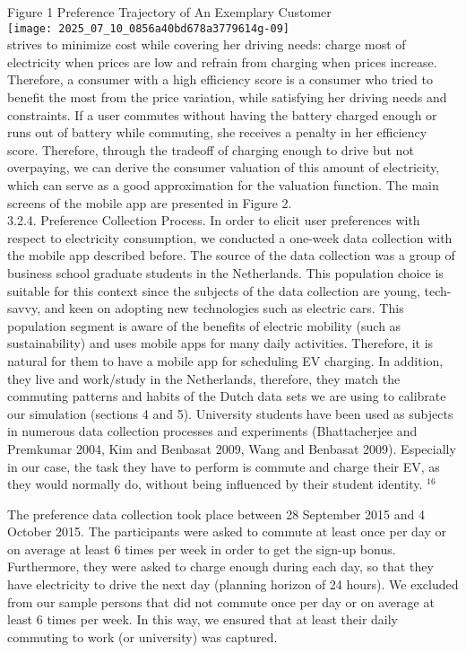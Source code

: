 \documentclass[10pt]{article}
\begin{document}
Figure 1 Preference Trajectory of An Exemplary Customer\\
\texttt{[image: 2025\_07\_10\_0856a40bd678a3779614g-09]}\\
strives to minimize cost while covering her driving needs: charge most of electricity when prices are low and refrain from charging when prices increase. Therefore, a consumer with a high efficiency score is a consumer who tried to benefit the most from the price variation, while satisfying her driving needs and constraints. If a user commutes without having the battery charged enough or runs out of battery while commuting, she receives a penalty in her efficiency score. Therefore, through the tradeoff of charging enough to drive but not overpaying, we can derive the consumer valuation of this amount of electricity, which can serve as a good approximation for the valuation function. The main screens of the mobile app are presented in Figure 2.\\
3.2.4. Preference Collection Process. In order to elicit user preferences with respect to electricity consumption, we conducted a one-week data collection with the mobile app described before. The source of the data collection was a group of business school graduate students in the Netherlands. This population choice is suitable for this context since the subjects of the data collection are young, tech-savvy, and keen on adopting new technologies such as electric cars. This population segment is aware of the benefits of electric mobility (such as sustainability) and uses mobile apps for many daily activities. Therefore, it is natural for them to have a mobile app for scheduling EV charging. In addition, they live and work/study in the Netherlands, therefore, they match the\\
commuting patterns and habits of the Dutch data sets we are using to calibrate our simulation (sections 4 and 5). University students have been used as subjects in numerous data collection processes and experiments (Bhattacherjee and Premkumar 2004, Kim and Benbasat 2009, Wang and Benbasat 2009). Especially in our case, the task they have to perform is commute and charge their EV, as they would normally do, without being influenced by their student identity. ${ }^{16}$

The preference data collection took place between 28 September 2015 and 4 October 2015. The participants were asked to commute at least once per day or on average at least 6 times per week in order to get the sign-up bonus. Furthermore, they were asked to charge enough during each day, so that they have electricity to drive the next day (planning horizon of 24 hours). We excluded from our sample persons that did not commute once per day or on average at least 6 times per week. In this way, we ensured that at least their daily commuting to work (or university) was captured.
\end{document}
